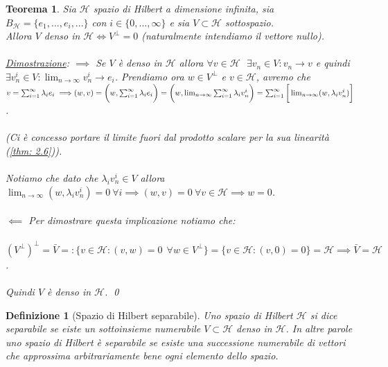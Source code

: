 \documentclass[a4paper,12pt]{report}
\newtheorem{teorema}{Teorema}[chapter]
\newtheorem{definizione}{Definizione}[chapter]
\begin{document}
\begin{teorema}\label{thm: 2.9}
    Sia $\mathscr{H}$ spazio di Hilbert a dimensione infinita, sia $B_{\mathscr{H}}=\{e_1,...,e_i,...\}$ con $i \in \{0,...,\infty\}$ e sia $V \subset \mathscr{H}$ sottospazio. 
    \\Allora $V$ denso in $\mathscr{H} \iff V^{\perp}=0$ (naturalmente intendiamo il vettore nullo).
    \\
    \\ \underline{Dimostrazione}: $\boxed{\implies}$ Se $V$ è denso in $\mathscr{H}$ allora $\forall v \in \mathscr{H} \ \  \  \exists v_n\in V: v_n \to v$ e quindi $\exists v_n^i \in V: \displaystyle\lim_{n\to\infty}v_n^i \to e_i$. Prendiamo ora $w \in V^{\perp}$ e $v \in \mathscr{H}$, avremo che $v=\sum_{i=1}^
    {\infty}\lambda_i e_i
    \implies 
    \\(w,v)=\bigg(w, \sum_{i=1}^{\infty}\lambda_i e_i\bigg)=\bigg(w, \lim_{n\to \infty}\sum_{i=1}^{\infty}\lambda_iv_n^i\bigg)=\sum_{i=1}^{\infty}\bigg[\lim_{n \to\infty}(w,\lambda_iv_n^i)\bigg]$. 
    \\
    \\(Ci è concesso portare il limite fuori dal prodotto scalare per la sua linearità (\ref{thm: 2.6})).
    \\
    \\ Notiamo che dato che $\lambda_iv_n^i \in V$ allora \mbox{$\displaystyle\lim_{n\to\infty}(w,\lambda_iv_n^i)=0 \ \forall i\implies (w,v)=0 \ \forall v \in \mathscr{H}\implies w=0$}.
    \\
    \\ $\boxed{\impliedby}$ Per dimostrare questa implicazione notiamo che:
    \\
    \\\mbox{$(V^{\perp})^{\perp}=\bar{V}=:\{v\in \mathscr{H}:(v,w)=0 \  \ \forall w\in V^{\perp}\}=\{v \in \mathscr{H}:(v,0)=0\}=\mathscr{H}\implies \bar{V}=\mathscr{H}$}.
    \\
    \\ Quindi $V$ è denso in $\mathscr{H}$. \qed
\end{teorema} 

\newpage

\begin{definizione}[Spazio di Hilbert separabile]\label{def: 2.13}
    Uno spazio di Hilbert $\mathscr{H}$ si dice separabile se eiste un sottoinsieme numerabile $V\subset \mathscr{H}$ denso in $\mathscr{H}$. In altre parole uno spazio di Hilbert è separabile se esiste una successione numerabile di vettori che approssima arbitrariamente bene ogni elemento dello spazio.
\end{definizione}
\end{document}
